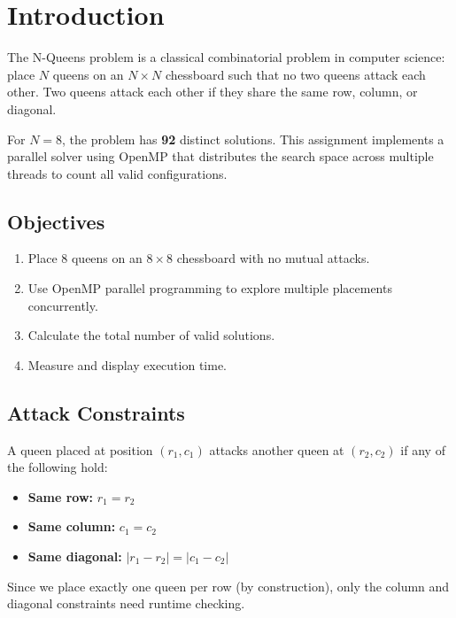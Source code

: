\documentclass[11pt]{article}
\begin{document}
\section{Introduction}

The N-Queens problem is a classical combinatorial problem in computer science: place $N$ queens on an $N \times N$ chessboard such that no two queens attack each other. Two queens attack each other if they share the same row, column, or diagonal.

For $N = 8$, the problem has \textbf{92} distinct solutions. This assignment implements a parallel solver using OpenMP that distributes the search space across multiple threads to count all valid configurations.

\subsection{Objectives}
\begin{enumerate}
    \item Place 8 queens on an $8 \times 8$ chessboard with no mutual attacks.
    \item Use OpenMP parallel programming to explore multiple placements concurrently.
    \item Calculate the total number of valid solutions.
    \item Measure and display execution time.
\end{enumerate}

\subsection{Attack Constraints}

A queen placed at position $(r_1, c_1)$ attacks another queen at $(r_2, c_2)$ if any of the following hold:

\begin{shadedbox}
\begin{itemize}
    \item \textbf{Same row:} $r_1 = r_2$
    \item \textbf{Same column:} $c_1 = c_2$
    \item \textbf{Same diagonal:} $|r_1 - r_2| = |c_1 - c_2|$
\end{itemize}
Since we place exactly one queen per row (by construction), only the column and diagonal constraints need runtime checking.
\end{shadedbox}
\end{document}

